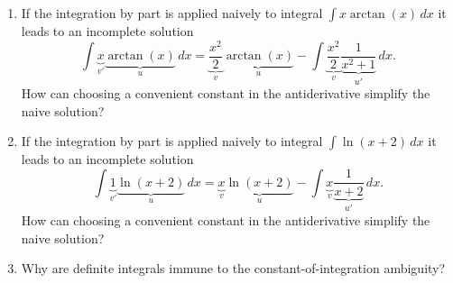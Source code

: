 \begin{enumerate}
  \item If the integration by part is applied naively to integral \(\int x\arctan(x) \, dx\) it leads to an incomplete solution
    \[ \int \underbrace{x}_{v'}\underbrace{\arctan(x)}_{u}\, dx = \underbrace{\frac{x^{2}}{2}}_{v}\underbrace{\arctan(x)}_{u}- \int \underbrace{\frac{x^{2}}{2}}_{v}\underbrace{\frac{1}{x^{2}+1}}_{u'}\,dx. \]
    How can choosing a convenient constant in the antiderivative simplify the naive solution?
  \item If the integration by part is applied naively to integral \(\int \ln(x+2) \, dx\) it leads to an incomplete solution
    \[ \int \underbrace{1}_{v'}\underbrace{\ln(x+2)}_{u}\, dx = \underbrace{x}_{v}\underbrace{\ln(x+2)}_{u}- \int \underbrace{x}_{v}\underbrace{\frac{1}{x+2}}_{u'}\, dx. \]
    How can choosing a convenient constant in the antiderivative simplify the naive solution?
  \item Why are definite integrals immune to the constant-of-integration ambiguity?
\end{enumerate}
